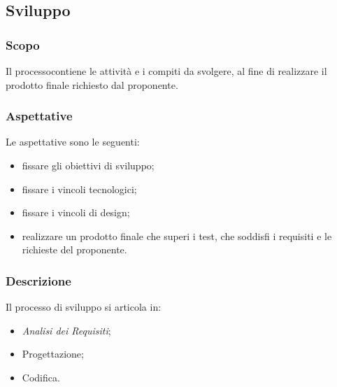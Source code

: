 		\begin{comment} 
		\textbf{(questa ultima sezione è da inserire nella fase successiva)}
		\subsubsection{Collaudo e consegna del prodotto}
		Al fine di consegnare il prodotto terminato il gruppo deve effettuare un collaudo in presenza del proponente e dei committenti. Precedentemente a questo test il gruppo deve assicurare correttezza, completezza e affidabilità per ogni parte del materiale consegnato, permettendo così che tutti i requisiti obbligatori siano soddisfatti e l'esecuzione dei test abbiano un esito positivo. In seguito al collaudo finale il responsabile di progetto consegna il prodotto su un supporto fisico.
		\end{comment}  
     
\subsection{Sviluppo}
	\subsubsection{Scopo}
	Il processo\glosp contiene le attività e i compiti da svolgere, al fine di realizzare il prodotto finale richiesto dal proponente.
	\subsubsection{Aspettative}
	Le aspettative sono le seguenti:
	\begin{itemize}
		\item fissare gli obiettivi di sviluppo;
		\item fissare i vincoli tecnologici;
		\item fissare i vincoli di design;
		\item realizzare un prodotto finale che superi i test, che soddisfi i requisiti e le richieste del proponente.
	\end{itemize}
	\subsubsection{Descrizione}
	Il processo di sviluppo si articola in:
	\begin{itemize}
		\item \textit{Analisi dei Requisiti};
		\item Progettazione;
		\item Codifica.
	\end{itemize}
